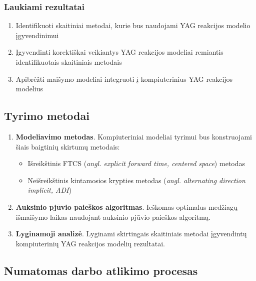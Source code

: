 \documentclass[]{VUMIFTemplateClass}
\begin{document}
\subsubsection{Laukiami rezultatai}
\begin{enumerate}
    \item Identifikuoti skaitiniai metodai, kurie bus naudojami YAG reakcijos modelio įgyvendinimui

    \item Įgyvendinti korektiškai veikiantys YAG reakcijos modeliai remiantis identifikuotais skaitiniais metodais

    \item Apibrėžti maišymo modeliai integruoti į kompiuterinius YAG reakcijos modelius

\end{enumerate}

\newpage

\subsection{Tyrimo metodai}

\begin{enumerate}
    \item \textbf{Modeliavimo metodas}. Kompiuteriniai modeliai tyrimui bus konstruojami šiais baigtinių skirtumų metodais:
    \begin{itemize}
        \item Išreikštinis FTCS (\textit{angl. explicit forward time, centered space}) metodas
        \item Neišreikštinis kintamosios krypties metodas (\textit{angl. alternating direction implicit, ADI}) 
    \end{itemize}
    \item \textbf{Auksinio pjūvio paieškos algoritmas}. Ieškomas optimalus medžiagų išmaišymo laikas naudojant auksinio pjūvio paieškos algoritmą.
    \item \textbf{Lyginamoji analizė}. Lyginami skirtingais skaitiniais metodai įgyvendintų kompiuterinių YAG reakcijos modelių rezultatai. 
\end{enumerate}


\subsection{Numatomas darbo atlikimo procesas}
\end{document}

